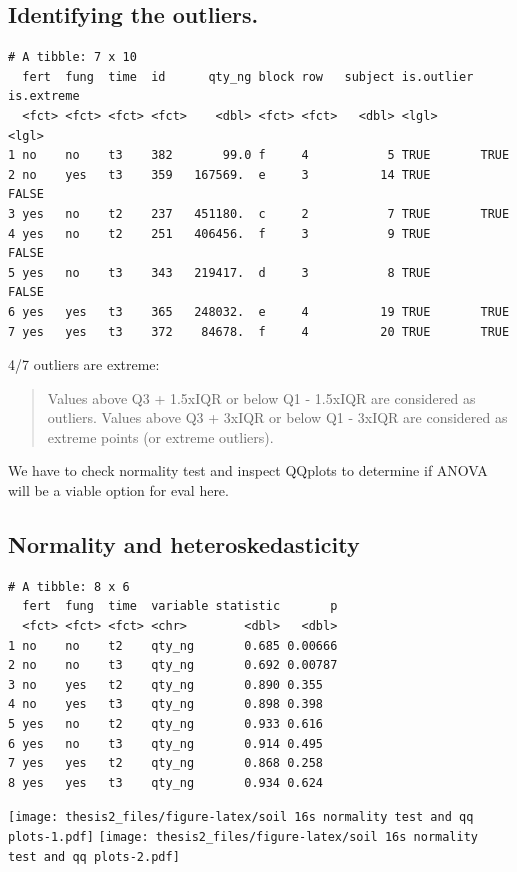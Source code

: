 \documentclass[twoside,12pt,final]{ucthesis-CA2012}
\newenvironment{Shaded}{}{}
\newcommand{\KeywordTok}[1]{\textcolor[rgb]{0.00,0.44,0.13}{\textbf{{#1}}}}
\newcommand{\StringTok}[1]{\textcolor[rgb]{0.25,0.44,0.63}{{#1}}}
\newcommand{\NormalTok}[1]{{#1}}
\newcommand{\OperatorTok}[1]{\textcolor[rgb]{0.00,0.44,0.13}{\textbf{{#1}}}}
\begin{document}
\begin{ucmainmatter}
{\subsection{Identifying the outliers.}\label{identifying-the-outliers.}}
\begin{Shaded}
\end{Shaded}
\begin{verbatim}
# A tibble: 7 x 10
  fert  fung  time  id      qty_ng block row   subject is.outlier is.extreme
  <fct> <fct> <fct> <fct>    <dbl> <fct> <fct>   <dbl> <lgl>      <lgl>     
1 no    no    t3    382       99.0 f     4           5 TRUE       TRUE      
2 no    yes   t3    359   167569.  e     3          14 TRUE       FALSE     
3 yes   no    t2    237   451180.  c     2           7 TRUE       TRUE      
4 yes   no    t2    251   406456.  f     3           9 TRUE       FALSE     
5 yes   no    t3    343   219417.  d     3           8 TRUE       FALSE     
6 yes   yes   t3    365   248032.  e     4          19 TRUE       TRUE      
7 yes   yes   t3    372    84678.  f     4          20 TRUE       TRUE      
\end{verbatim}
4/7 outliers are extreme:
\begin{quote}
Values above Q3 + 1.5xIQR or below Q1 - 1.5xIQR are considered as outliers. Values above Q3 + 3xIQR or below Q1 - 3xIQR are considered as extreme points (or extreme outliers).
\end{quote}
We have to check normality test and inspect QQplots to determine if ANOVA will be a viable option for eval here.

\hypertarget{normality-and-heteroskedasticity-1}{%
\subsection{Normality and heteroskedasticity}\label{normality-and-heteroskedasticity-1}}
\begin{verbatim}
# A tibble: 8 x 6
  fert  fung  time  variable statistic       p
  <fct> <fct> <fct> <chr>        <dbl>   <dbl>
1 no    no    t2    qty_ng       0.685 0.00666
2 no    no    t3    qty_ng       0.692 0.00787
3 no    yes   t2    qty_ng       0.890 0.355  
4 no    yes   t3    qty_ng       0.898 0.398  
5 yes   no    t2    qty_ng       0.933 0.616  
6 yes   no    t3    qty_ng       0.914 0.495  
7 yes   yes   t2    qty_ng       0.868 0.258  
8 yes   yes   t3    qty_ng       0.934 0.624  
\end{verbatim}
\texttt{[image: thesis2\_files/figure-latex/soil 16s normality test and qq plots-1.pdf]} \texttt{[image: thesis2\_files/figure-latex/soil 16s normality test and qq plots-2.pdf]}


\end{ucmainmatter}
\end{document}
